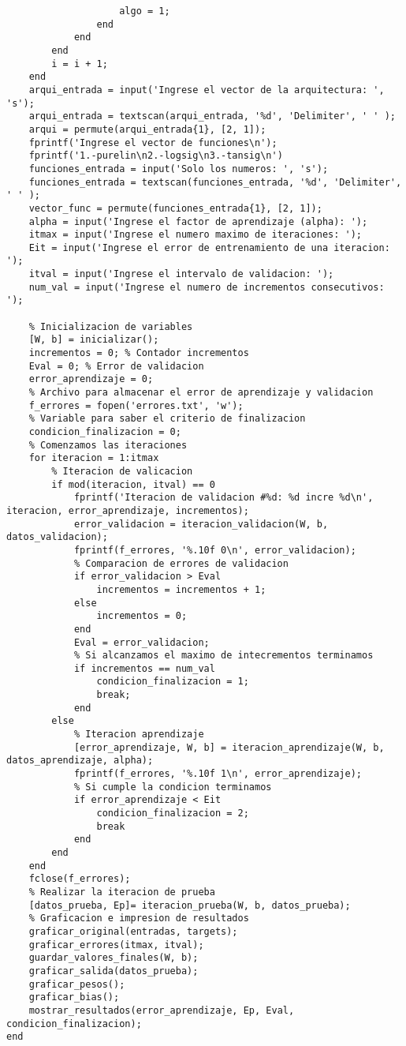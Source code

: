 \begin{lstlisting}
                    algo = 1;
                end
            end
        end
        i = i + 1;
    end
    arqui_entrada = input('Ingrese el vector de la arquitectura: ', 's');
    arqui_entrada = textscan(arqui_entrada, '%d', 'Delimiter', ' ' );
    arqui = permute(arqui_entrada{1}, [2, 1]);
    fprintf('Ingrese el vector de funciones\n');
    fprintf('1.-purelin\n2.-logsig\n3.-tansig\n')
    funciones_entrada = input('Solo los numeros: ', 's');
    funciones_entrada = textscan(funciones_entrada, '%d', 'Delimiter', ' ' );
    vector_func = permute(funciones_entrada{1}, [2, 1]);
    alpha = input('Ingrese el factor de aprendizaje (alpha): ');
    itmax = input('Ingrese el numero maximo de iteraciones: ');
    Eit = input('Ingrese el error de entrenamiento de una iteracion: ');
    itval = input('Ingrese el intervalo de validacion: ');
    num_val = input('Ingrese el numero de incrementos consecutivos: ');
    
    % Inicializacion de variables
    [W, b] = inicializar();
    incrementos = 0; % Contador incrementos
    Eval = 0; % Error de validacion
    error_aprendizaje = 0;
    % Archivo para almacenar el error de aprendizaje y validacion
    f_errores = fopen('errores.txt', 'w');
    % Variable para saber el criterio de finalizacion
    condicion_finalizacion = 0;
    % Comenzamos las iteraciones
    for iteracion = 1:itmax
        % Iteracion de valicacion
        if mod(iteracion, itval) == 0
            fprintf('Iteracion de validacion #%d: %d incre %d\n', iteracion, error_aprendizaje, incrementos);
            error_validacion = iteracion_validacion(W, b, datos_validacion);
            fprintf(f_errores, '%.10f 0\n', error_validacion);
            % Comparacion de errores de validacion
            if error_validacion > Eval
                incrementos = incrementos + 1;
            else
                incrementos = 0;
            end
            Eval = error_validacion;
            % Si alcanzamos el maximo de intecrementos terminamos
            if incrementos == num_val
                condicion_finalizacion = 1;
                break;
            end
        else
            % Iteracion aprendizaje
            [error_aprendizaje, W, b] = iteracion_aprendizaje(W, b, datos_aprendizaje, alpha);
            fprintf(f_errores, '%.10f 1\n', error_aprendizaje);
            % Si cumple la condicion terminamos
            if error_aprendizaje < Eit
                condicion_finalizacion = 2;
                break
            end
        end 
    end
    fclose(f_errores);
    % Realizar la iteracion de prueba
    [datos_prueba, Ep]= iteracion_prueba(W, b, datos_prueba);
    % Graficacion e impresion de resultados
    graficar_original(entradas, targets);
    graficar_errores(itmax, itval);
    guardar_valores_finales(W, b);
    graficar_salida(datos_prueba);
    graficar_pesos();
    graficar_bias();
    mostrar_resultados(error_aprendizaje, Ep, Eval, condicion_finalizacion);
end


\end{lstlisting}
